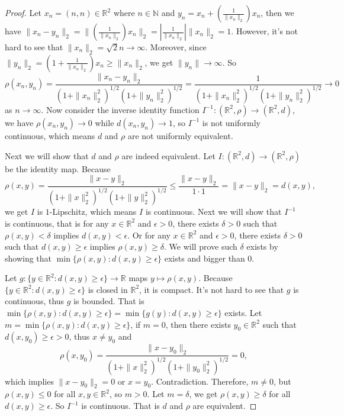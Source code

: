 \documentclass[12pt, a4paper]{article}
\theoremstyle{plain}
\newcommand{\N}{\mathbb{N}}
\newcommand{\R}{\mathbb{R}}
\begin{document}
	\begin{proof}
	Let $x_n=(n,n)\in\R^2$ where $n\in\N$ and $y_n=x_n+\left(\frac{1}{\|x_n\|_2}\right)x_n$, then we have $\|x_n-y_n\|_2=\|\left(\frac{1}{\|x_n\|_2}\right)x_n\|_2=\left|\frac{1}{\|x_n\|_2}\right|\|x_n\|_2=1$. However, it's not hard to see that $\|x_n\|_2=\sqrt{2}n\rightarrow \infty$. Moreover, since $\|y_n\|_2=\left(1+\frac{1}{\|x_n\|_2}\right)x_n\geq \|x_n\|_2$, we get $\|y_n\|\rightarrow \infty$. So 
	\[
	\rho(x_n,y_n)=\frac{\|x_n-y_n\|_2}{(1+\|x_n\|_2^2)^{1/2}(1+\|y_n\|_2^2)^{1/2}}=\frac{1}{(1+\|x_n\|_2^2)^{1/2}(1+\|y_n\|_2^2)^{1/2}}\rightarrow 0
	\]
	as $n\rightarrow\infty$. Now consider the inverse identity function $I^{-1}:(\R^2,\rho)\rightarrow (\R^2,d)$, we have $\rho(x_n,y_n)\rightarrow 0$ while $d(x_n,y_n)\rightarrow 1$, so $I^{-1}$ is not uniformly continuous, which means $d$ and $\rho$ are not uniformly equivalent.
	
	Next we will show that $d$ and $\rho$ are indeed equivalent. Let $I:(\R^2,d)\rightarrow (\R^2,\rho)$ be the identity map. Because 
	\[
	\rho(x,y)=\frac{\|x-y\|_2}{(1+\|x\|_2^2)^{1/2}(1+\|y\|_2^2)^{1/2}}\leq \frac{\|x-y\|_2}{1\cdot 1}=\|x-y\|_2=d(x,y),
	\]
	we get $I$ is $1$-Lipschitz, which means $I$ is continuous. Next we will show that $I^{-1}$ is continuous, that is for any $x\in\R^2$ and $\epsilon>0$, there exists $\delta>0$ such that $\rho(x,y)<\delta$ implies $d(x,y)<\epsilon$. Or for any $x\in\R^2$ and $\epsilon>0$, there exists $\delta>0$ such that $d(x,y)\geq\epsilon$ implies $\rho(x,y)\geq\delta$. We will prove such $\delta$ exists by showing that $\min\{\rho(x,y):d(x,y)\geq\epsilon\}$ exists and bigger than $0$. 
	
	
	
	
	
	Let $g:\{y\in\R^2:d(x,y)\geq\epsilon\}\rightarrow \R$ maps $y\mapsto \rho(x,y)$. Because $\{y\in\R^2:d(x,y)\geq\epsilon\}$ is closed in $\R^2$, it is compact. It's not hard to see that $g$ is continuous, thus $g$ is bounded. That is  $\min\{\rho(x,y):d(x,y)\geq\epsilon\}=\min\{g(y):d(x,y)\geq\epsilon\}$ exists. Let $m=\min\{\rho(x,y):d(x,y)\geq\epsilon\}$, if $m=0$, then there exists $y_0\in\R^2$ such that $d(x,y_0)\geq \epsilon>0$, thus $x\neq y_0$ and
	\[
	\rho(x,y_0)=\frac{\|x-y_0\|_2}{(1+\|x\|_2^2)^{1/2}(1+\|y_0\|_2^2)^{1/2}}=0,
	\]
	which implies $\|x-y_0\|_2=0$ or $x=y_0$. Contradiction. Therefore, $m\neq 0$, but $\rho(x,y)\leq 0$ for all $x,y\in\R^2$, so $m>0$. Let $m=\delta$, we get $\rho(x,y)\geq \delta$ for all $d(x,y)\geq \epsilon$. So $I^{-1}$ is continuous. That is $d$ and $\rho$ are equivalent.
	\end{proof}
	
\end{document}
